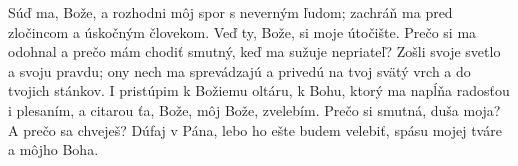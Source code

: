 Súď ma, Bože, a rozhodni môj spor s neverným ľudom;
zachráň ma pred zločincom a úskočným človekom.
\versseparator
Veď ty, Bože, si moje útočište.
Prečo si ma odohnal
a prečo mám chodiť smutný, keď ma sužuje nepriateľ?
\versseparator
Zošli svoje svetlo a svoju pravdu;
ony nech ma sprevádzajú a privedú
na tvoj svätý vrch a do tvojich stánkov.
\versseparator
I pristúpim k Božiemu oltáru,
k Bohu, ktorý ma napĺňa radosťou i plesaním,
\versseparator
a citarou ťa, Bože, môj Bože, zvelebím.
Prečo si smutná, duša moja? A prečo sa chveješ?
\versseparator
Dúfaj v Pána, lebo ho ešte budem velebiť,
spásu mojej tváre a môjho Boha.
